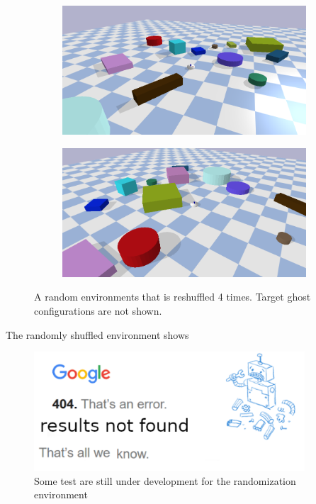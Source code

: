 \begin{figure}[H]
    \vspace{0.2cm}
    \begin{subfigure}{.49\textwidth}
    \includegraphics[width=\textwidth]{figures/tests/random3}
    \end{subfigure}
    \hfill
    \begin{subfigure}{.49\textwidth}
    \centering
    \includegraphics[width=\textwidth]{figures/tests/random4}
    \end{subfigure}
    \caption{A random environments that is reshuffled 4 times. Target ghost configurations are not shown.}
    \label{fig:random_environment_reshuffle}
\end{figure}
The randomly shuffled environment shows 

\begin{figure}[H]
    \centering
    \includegraphics[width=0.9\textwidth]{figures/tests/404_not_found}
    \caption{Some test are still under development for the randomization environment}%
    \label{fig:results_randomisation}
\end{figure}

